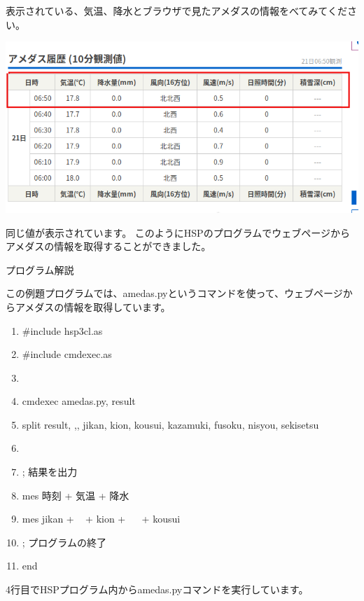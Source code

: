 \documentclass[a4paper,12pt,dvipdfmx]{jarticle}
\begin{document}
\bigskip


\bigskip

表示されている、気温、降水とブラウザで見たアメダスの情報をべてみてください。



\begin{center}
\includegraphics[width=17.006cm]{textbook-img029-1.png}

\end{center}
同じ値が表示されています。
このようにHSPのプログラムでウェブページからアメダスの情報を取得することができました。


\bigskip

\clearpage
プログラム解説

この例題プログラムでは、amedas.pyというコマンドを使って、ウェブページからアメダスの情報を取得しています。

\begin{center}
\begin{boxedminipage}{17.126cm}
\begin{enumerate}
\baselineskip 10pt
\setlength{\itemsep}{0cm} %
\item \#include {\textquotedbl}hsp3cl.as{\textquotedbl}
\item \#include {\textquotedbl}cmdexec.as{\textquotedbl}
\item
\item cmdexec {\textquotedbl}amedas.py{\textquotedbl}, result
\item split result, {\textquotedbl},{\textquotedbl}, jikan, kion, kousui, kazamuki, fusoku, nisyou, sekisetsu
\item
\item ; 結果を出力
\item mes {\textquotedbl}時刻 {\textquotedbl} + {\textquotedbl}気温 {\textquotedbl} +
{\textquotedbl}降水 {\textquotedbl} \
\item mes jikan + {\textquotedbl} \ {\textquotedbl} + kion + {\textquotedbl} \ \ {\textquotedbl} + kousui
\item ; プログラムの終了
\item end
\end{enumerate}
\end{boxedminipage}
\end{center}
4行目でHSPプログラム内からamedas.pyコマンドを実行しています。
\end{document}
